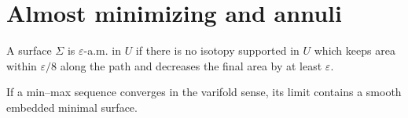 \chapter{Almost minimizing and annuli}

\begin{definition}\label{def:am}
A surface $\Sigma$ is $\varepsilon$-a.m. in $U$ if there is no isotopy supported in $U$ which keeps area within $\varepsilon/8$ along the path and decreases the final area by at least $\varepsilon$. \uses{}
\end{definition}

\begin{lemma}\label{lem:conv-reg}
If a min--max sequence converges in the varifold sense, its limit contains a smooth embedded minimal surface. 
\end{lemma}
